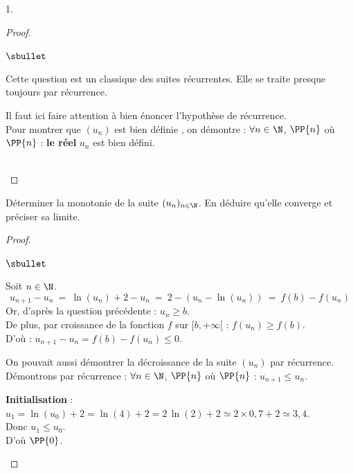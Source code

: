 \begin{noliste}{1.}
\begin{proof}
    \begin{remark}
     \begin{noliste}{$\sbullet$}
      \item Cette question est un classique des suites récurrentes. 
      Elle se traite presque toujours par récurrence.
      
      \item Il faut ici faire attention à bien énoncer l'hypothèse de 
      récurrence. \\
      Pour montrer que  $(u_n)$ est bien 
      définie \fg{}, on démontre : $\forall n \in \N$, $\PP{n}$ 
      \quad où \quad $\PP{n}$ : {\bf le réel} $u_n$ est bien défini.
     \end{noliste}
    \end{remark}~\\[-1.4cm]
  \end{proof}

  
  \item Déterminer la monotonie de la suite $(u_n)_{n\in \N}$. En 
  déduire qu'elle converge et préciser sa limite.
  
  \begin{proof}~
    \begin{noliste}{$\sbullet$}
      \item Soit $n\in \N$.
      \[
        u_{n+1} - u_n \ = \ \ln(u_n) +2 -u_n \ = \ 
        2- (u_n - \ln(u_n)) \ = \ f(b) - f(u_n)
      \]
      Or, d'après la question précédente : $u_n \geq b$.\\
      De plus, par croissance de la fonction $f$ sur $[b,+\infty[$ :
      $f(u_n) \geq f(b)$.\\
      D'où : $u_{n+1} - u_n = f(b)-f(u_n) \leq 0$.
      
      
      \newpage
      
      
      \begin{remark}
        On pouvait aussi démontrer la décroissance de la suite 
        $(u_n)$ par récurrence.\\
        Démontrons par récurrence : $\forall n\in \N$, $\PP{n}$ 
      \quad où \quad $\PP{n}$ : $u_{n+1} \leq u_n$.
      \begin{noliste}{\fitem}
	\item {\bf Initialisation} :\\
	$u_1 = \ln(u_0) +2 = \ln(4) + 2 = 2 \, \ln(2)+2 \simeq 
	2 \times 0,7 +2 \simeq 3,4$.\\
	Donc $u_1 \leq u_0$.\\
	D'où $\PP{0}$.
	

\end{noliste}
\end{remark}
\end{noliste}
\end{proof}
\end{noliste}

